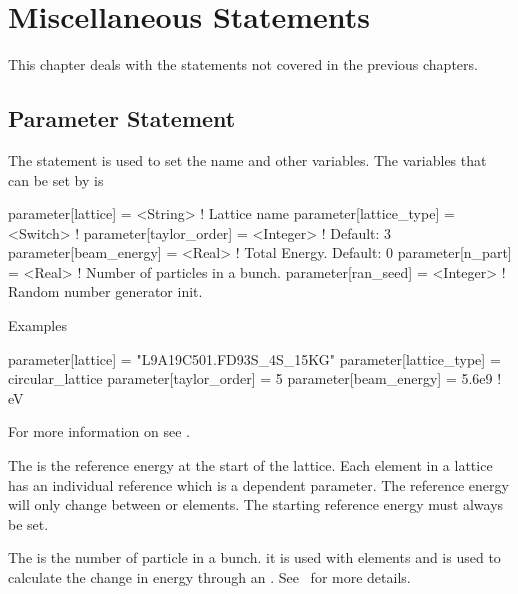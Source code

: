 \chapter{Miscellaneous Statements}

This chapter deals with the statements not covered in the previous chapters.

\section{Parameter Statement}
\label{s:param}


The  statement is used to set the  name and
other variables.  The variables that can be set by  is
\begin{example}
  parameter[lattice]      = <String>      ! Lattice name 
  parameter[lattice_type] = <Switch>      ! 
  parameter[taylor_order] = <Integer>     ! Default: 3
  parameter[beam_energy]  = <Real>        ! Total Energy. Default: 0
  parameter[n_part]       = <Real>        ! Number of particles in a bunch.
  parameter[ran_seed]     = <Integer>     ! Random number generator init.
\end{example}

\noindent
Examples
\begin{example}
  parameter[lattice]      = "L9A19C501.FD93S_4S_15KG"
  parameter[lattice_type] = circular_lattice
  parameter[taylor_order] = 5
  parameter[beam_energy]  = 5.6e9    ! eV
\end{example}

For more information on  see .

The  is the reference energy at the start of the
lattice.  Each element in a lattice has an individual reference
 which is a dependent parameter. 
The reference energy will only change between  or
 elements. The starting reference energy must always be set.

The  is the number of particle in a bunch.
it is used with  elements and is used to calculate the
change in energy through an . See~ for more
details.

